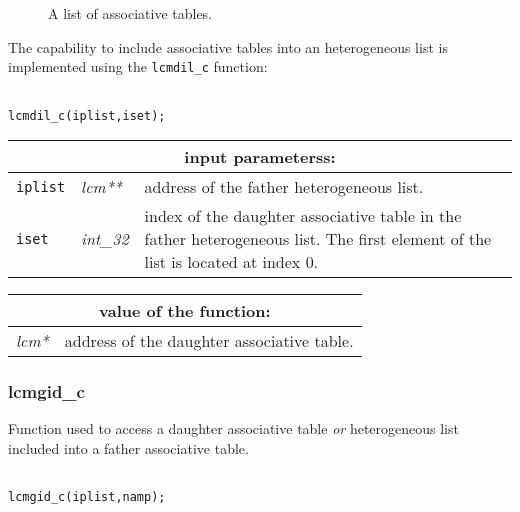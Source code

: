 \vskip 0.2cm

\begin{figure}[htbp]
\begin{center} 
\epsfxsize=9cm
\centerline{ }
\parbox{12cm}{\caption{A list of associative tables.}\label{fig:f1}}   
\end{center}  
\end{figure}

\vskip 0.2cm

The capability to include associative tables into an heterogeneous list is implemented using
the {\tt lcmdil\_c} function:

\begin{verbatim}

lcmdil_c(iplist,iset);
\end{verbatim}

\vskip 0.5cm

\noindent
\begin{tabular}{|p{1.5cm}|p{2cm}|p{11cm}|}
\hline
\multicolumn{3}{|c|}{\bf input parameterss:} \\
\hline
{\tt iplist} & {\it lcm**} & address of the father heterogeneous list. \\
\hline
{\tt iset} & {\it int\_32} & index of the daughter associative table in the father heterogeneous list.
The first element of the list is located at index $0$.  \\
\hline
\end{tabular}

\vskip 0.4cm

\noindent
\begin{tabular}{|p{4.0cm}|p{11cm}|}
\hline
\multicolumn{2}{|c|}{\bf value of the function:} \\
\hline
{\it lcm*} & address of the daughter associative table. \\
\hline
\end{tabular}

\subsubsection{lcmgid\_c}

Function used to access a daughter associative table {\sl or} heterogeneous list included into a father associative table. 

\begin{verbatim}

lcmgid_c(iplist,namp);
\end{verbatim}

